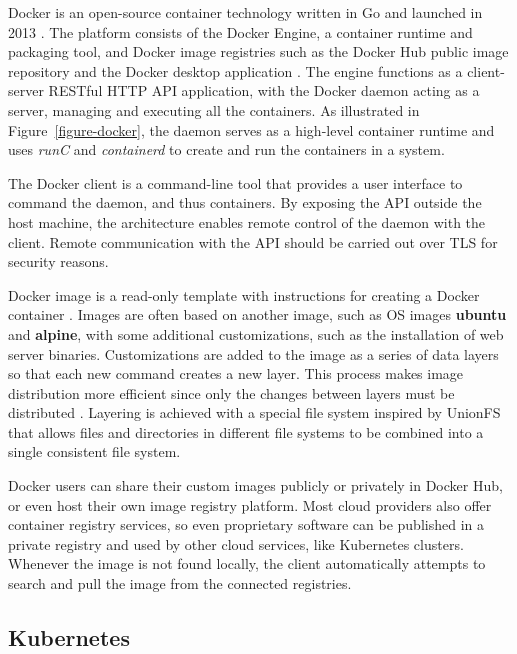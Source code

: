 \documentclass[english, 12pt, a4paper, sci, utf8, a-2b, online]{aaltothesis}
\begin{document}
Docker is an open-source container technology written in Go and launched in 2013 \cite{docker-what}.
The platform consists of the Docker Engine, a container runtime and packaging tool, and Docker image registries such as the Docker Hub public image repository and the Docker desktop application \cite{docker-overview}.
The engine functions as a client-server RESTful HTTP API application, with the Docker daemon acting as a server, managing and executing all the containers.
As illustrated in Figure~\ref*{figure-docker}, the daemon serves as a high-level container runtime and uses \emph{runC} and \emph{containerd} to create and run the containers in a system.

The Docker client is a command-line tool that provides a user interface to command the daemon, and thus containers.
By exposing the API outside the host machine, the architecture enables remote control of the daemon with the client.
Remote communication with the API should be carried out over TLS for security reasons.

Docker image is a read-only template with instructions for creating a Docker container \cite{docker-overview}.
Images are often based on another image, such as OS images \textbf{ubuntu} and \textbf{alpine}, with some additional customizations, such as the installation of web server binaries.
Customizations are added to the image as a series of data layers so that each new command creates a new layer.
This process makes image distribution more efficient since only the changes between layers must be distributed \cite{bui2015analysis}.
Layering is achieved with a special file system inspired by UnionFS that allows files and directories in different file systems to be combined into a single consistent file system.

Docker users can share their custom images publicly or privately in Docker Hub, or even host their own image registry platform.
Most cloud providers also offer container registry services, so even proprietary software can be published in a private registry and used by other cloud services, like Kubernetes clusters.
Whenever the image is not found locally, the client automatically attempts to search and pull the image from the connected registries.

\subsection{Kubernetes}
\end{document}
